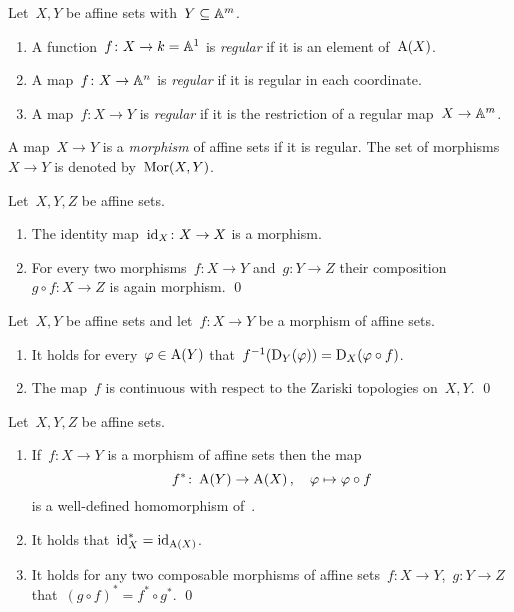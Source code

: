 \begin{definition}
  \label{regular for affine}
  Let~$X,Y$ be affine sets with~$Y \subseteq \mathbb{A}^m$.
  \begin{enumerate}
    \item
      A function~$f \colon X \to k = \mathbb{A}^1$ is \emph{regular} if it is an element of~$\operatorname{A}(X)$.
    \item
      A map~$f \colon X \to \mathbb{A}^n$ is \emph{regular} if it is regular in each coordinate.
    \item
      A map~$f \colon X \to Y$ is \emph{regular} if it is the restriction of a regular map~$X \to \mathbb{A}^m$.
  \end{enumerate}
  A map~$X \to Y$ is a \emph{morphism} of affine sets if it is regular.
  The set of morphisms~$X \to Y$ is denoted by~$\operatorname{Mor}(X,Y)$.
\end{definition}


\begin{lemma}
  Let~$X, Y, Z$ be affine sets.
  \begin{enumerate}
    \item
      The identity map~$\operatorname{id}_X \colon X \to X$ is a morphism.
    \item
      For every two morphisms~$f \colon X \to Y$ and~$g \colon Y \to Z$ their composition~$g \circ f \colon X \to Z$ is again morphism.
    \qed
  \end{enumerate}
\end{lemma}


\begin{lemma}
  Let~$X,Y$ be affine sets and let~$f \colon X \to Y$ be a morphism of affine sets.
  \begin{enumerate}
    \item
      It holds for every~$\varphi \in \operatorname{A}(Y)$ that~$f^{-1}(\operatorname{D}_Y(\varphi)) = \operatorname{D}_X(\varphi \circ f)$.
    \item
      The map~$f$ is continuous with respect to the Zariski topologies on~$X, Y$.
    \qed
  \end{enumerate}
\end{lemma}


\begin{lemma}
  \label{fuctoriality of the coordinate ring}
  Let~$X, Y, Z$ be affine sets.
  \begin{enumerate}
    \item
      If~$f \colon X \to Y$ is a morphism of affine sets then the map
      \[
                f^*
        \colon  \operatorname{A}(Y)
        \to     \operatorname{A}(X) \,,
        \quad   \varphi
        \mapsto \varphi \circ f
      \]
      is a well-defined homomorphism of~.
    \item
      It holds that~$\operatorname{id}_X^* = \operatorname{id}_{\operatorname{A}(X)}$.
    \item
      It holds for any two composable morphisms of affine sets~$f \colon X \to Y$,~$g \colon Y \to Z$ that~$(g \circ f)^* = f^* \circ g^*$.
    \qed
  \end{enumerate}
\end{lemma}


